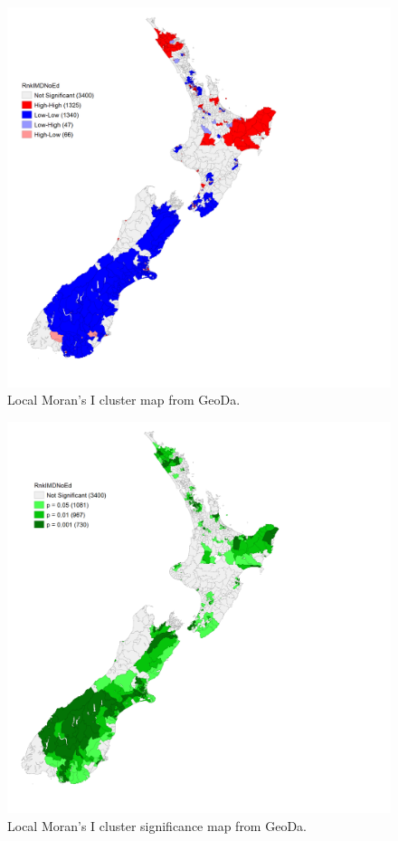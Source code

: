 \documentclass[
  letterpaper,
  DIV=11,
  numbers=noendperiod,
  oneside]{scrartcl}
\begin{document}
\begin{figure}

{\centering \includegraphics{imdnoed_localmoranI_uni_clustermap.png}

}

\caption{\label{fig-localiclusters}Local Moran's I cluster map from
GeoDa.}

\end{figure}

\begin{figure}

{\centering \includegraphics{imdnoed_localmoranI_uni_significance map.png}

}

\caption{\label{fig-localisig}Local Moran's I cluster significance map
from GeoDa.}

\end{figure}
\end{document}
